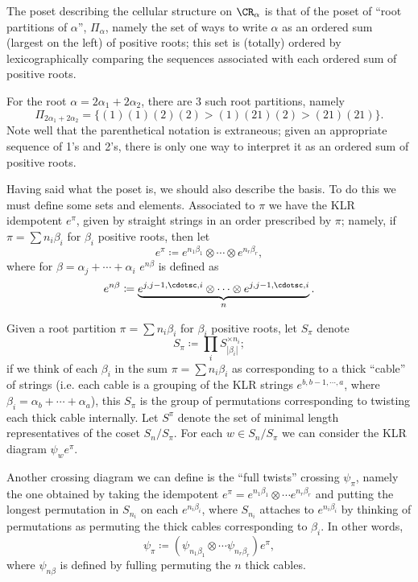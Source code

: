 \documentclass[11pt,reqno]{amsart}
\begin{document}
The poset describing the cellular structure on $\CR_\alpha$ is that of the poset of ``root partitions of $\alpha$'', $\Pi_\alpha$, namely the set of ways to write $\alpha$ as an ordered sum (largest on the left) of positive roots; this set is (totally) ordered by lexicographically comparing the sequences associated with each ordered sum of positive roots.
\begin{example}
    For the root $\alpha=2\alpha_1+2\alpha_2$, there are 3 such root partitions, namely
    \[\Pi_{2\alpha_1+2\alpha_2}=\{(1)(1)(2)(2)>(1)(21)(2)>(21)(21)\}.\] 
    Note well that the parenthetical notation is extraneous; given an appropriate sequence of 1's and 2's, there is only one way to interpret it as an ordered sum of positive roots.
\end{example}

Having said what the poset is, we should also describe the basis. To do this we must define some sets and elements. Associated to $\pi$ we have the KLR idempotent $e^\pi$, given by straight strings in an order prescribed by $\pi$; namely, if $\pi=\sum n_i\beta_i$ for $\beta_i$ positive roots, then let
\[e^\pi\coloneqq e^{n_1\beta_1}\otimes\cdots\otimes e^{n_r\beta_r},\] 
where for $\beta=\alpha_j+\cdots+\alpha_i$ $e^{n\beta}$ is defined as 
\[e^{n\beta}\coloneqq \underbrace{e^{j,j-1,\cdotsc,i}\otimes\cdots\otimes e^{j,j-1,\cdotsc,i}}_{n}.\]

Given a root partition $\pi=\sum n_i \beta_i$ for $\beta_i$ positive roots, let $S_\pi$ denote 
\[S_\pi\coloneqq \prod_i S_{|\beta_i|}^{\times n_i};\] 
if we think of each $\beta_i$ in the sum $\pi=\sum n_i \beta_i$ as corresponding to a thick ``cable'' of strings (i.e. each cable is a grouping of the KLR strings $e^{b,b-1,\cdots,a}$, where $\beta_i=\alpha_b+\cdots+\alpha_a$), this $S_\pi$ is the group of permutations corresponding to twisting each thick cable internally. Let $S^\pi$ denote the set of minimal length representatives of the coset $S_n/S_\pi$. For each $w\in S_n/S_\pi$ we can consider the KLR diagram $\psi_w e^\pi$. 

Another crossing diagram we can define is the ``full twists'' crossing $\psi_\pi$, namely the one obtained by taking the idempotent $e^\pi=e^{n_1\beta_1}\otimes\cdots e^{n_r\beta_r}$ and putting the longest permutation in $S_{n_i}$ on each $e^{n_i\beta_i}$, where $S_{n_i}$ attaches to $e^{n_i\beta_i}$ by thinking of permutations as permuting the thick cables corresponding to $\beta_i$. In other words,
\[\psi_\pi\coloneqq (\psi_{n_1\beta_1}\otimes \cdots \psi_{n_r\beta_r})e^\pi,\] 
where $\psi_{n\beta}$ is defined by fulling permuting the $n$ thick cables.
\end{document}

